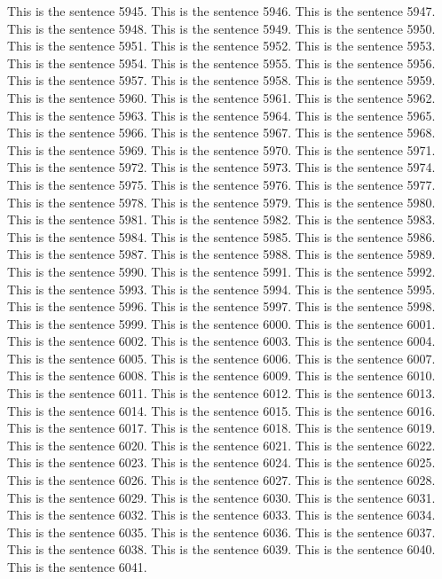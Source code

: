 \documentclass{article}
\begin{document}
This is the sentence 5945.
This is the sentence 5946.
This is the sentence 5947.
This is the sentence 5948.
This is the sentence 5949.
This is the sentence 5950.
This is the sentence 5951.
This is the sentence 5952.
This is the sentence 5953.
This is the sentence 5954.
This is the sentence 5955.
This is the sentence 5956.
This is the sentence 5957.
This is the sentence 5958.
This is the sentence 5959.
This is the sentence 5960.
This is the sentence 5961.
This is the sentence 5962.
This is the sentence 5963.
This is the sentence 5964.
This is the sentence 5965.
This is the sentence 5966.
This is the sentence 5967.
This is the sentence 5968.
This is the sentence 5969.
This is the sentence 5970.
This is the sentence 5971.
This is the sentence 5972.
This is the sentence 5973.
This is the sentence 5974.
This is the sentence 5975.
This is the sentence 5976.
This is the sentence 5977.
This is the sentence 5978.
This is the sentence 5979.
This is the sentence 5980.
This is the sentence 5981.
This is the sentence 5982.
This is the sentence 5983.
This is the sentence 5984.
This is the sentence 5985.
This is the sentence 5986.
This is the sentence 5987.
This is the sentence 5988.
This is the sentence 5989.
This is the sentence 5990.
This is the sentence 5991.
This is the sentence 5992.
This is the sentence 5993.
This is the sentence 5994.
This is the sentence 5995.
This is the sentence 5996.
This is the sentence 5997.
This is the sentence 5998.
This is the sentence 5999.
This is the sentence 6000.
This is the sentence 6001.
This is the sentence 6002.
This is the sentence 6003.
This is the sentence 6004.
This is the sentence 6005.
This is the sentence 6006.
This is the sentence 6007.
This is the sentence 6008.
This is the sentence 6009.
This is the sentence 6010.
This is the sentence 6011.
This is the sentence 6012.
This is the sentence 6013.
This is the sentence 6014.
This is the sentence 6015.
This is the sentence 6016.
This is the sentence 6017.
This is the sentence 6018.
This is the sentence 6019.
This is the sentence 6020.
This is the sentence 6021.
This is the sentence 6022.
This is the sentence 6023.
This is the sentence 6024.
This is the sentence 6025.
This is the sentence 6026.
This is the sentence 6027.
This is the sentence 6028.
This is the sentence 6029.
This is the sentence 6030.
This is the sentence 6031.
This is the sentence 6032.
This is the sentence 6033.
This is the sentence 6034.
This is the sentence 6035.
This is the sentence 6036.
This is the sentence 6037.
This is the sentence 6038.
This is the sentence 6039.
This is the sentence 6040.
This is the sentence 6041.
\end{document}
